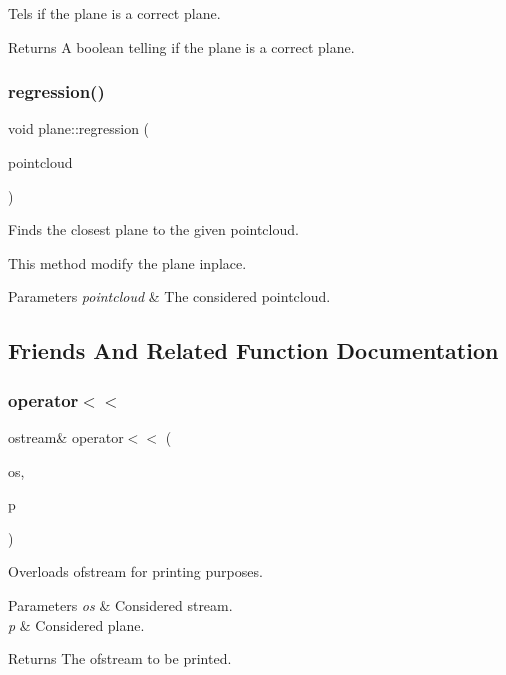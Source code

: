 Tels if the plane is a correct plane. 

\begin{DoxyReturn}{Returns}
A boolean telling if the plane is a correct plane. 
\end{DoxyReturn}
\mbox{\label{classplane_add743551ece037c4918698a46db02bf7}} 
\subsubsection{regression()}
{\footnotesize\ttfamily void plane\+::regression (\begin{DoxyParamCaption}\item[{\textbf{ point3d\+Cloud}}]{pointcloud }\end{DoxyParamCaption})}



Finds the closest plane to the given pointcloud. 

This method modify the plane inplace. 
\begin{DoxyParams}{Parameters}
{\em pointcloud} & The considered pointcloud. \\
\hline
\end{DoxyParams}


\subsection{Friends And Related Function Documentation}
\mbox{\label{classplane_ad9726324e2752901973bf9cdc8ae8c39}} 
\subsubsection{operator$<$$<$}
{\footnotesize\ttfamily ostream\& operator$<$$<$ (\begin{DoxyParamCaption}\item[{ostream \&}]{os,  }\item[{const \textbf{ plane} \&}]{p }\end{DoxyParamCaption})\hspace{0.3cm}{\ttfamily [friend]}}



Overloads ofstream for printing purposes. 


\begin{DoxyParams}{Parameters}
{\em os} & Considered stream. \\
\hline
{\em p} & Considered plane. \\
\hline
\end{DoxyParams}
\begin{DoxyReturn}{Returns}
The ofstream to be printed. 
\end{DoxyReturn}


